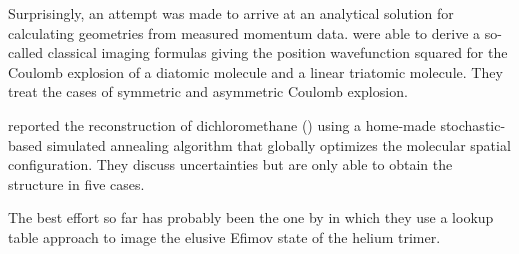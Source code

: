 
Surprisingly, an attempt was made to arrive at an analytical solution for calculating geometries from measured momentum data. \citet{Nagaya04} were able to derive a so-called classical imaging formulas giving the position wavefunction squared for the Coulomb explosion of a diatomic molecule and a linear triatomic molecule\footnotemark. They treat the cases of symmetric and asymmetric Coulomb explosion.


\citet{Gagnon08} reported the reconstruction of dichloromethane () using a home-made \footnotemark stochastic-based simulated annealing algorithm that globally optimizes the molecular spatial configuration. They discuss uncertainties but are only able to obtain the structure in five cases.


The best effort so far has probably been the one by \citet{Kunitski15} in which they use a lookup table approach to image the elusive Efimov state of the helium trimer.